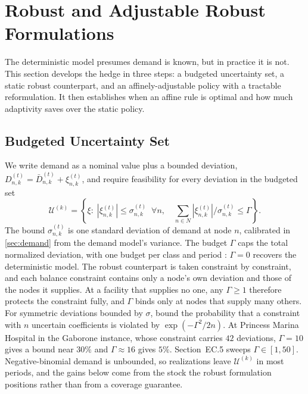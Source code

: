 \documentclass[11pt]{article}
\begin{document}
\section{Robust and Adjustable Robust Formulations}
\label{sec:robust}

The deterministic model presumes demand is known, but in practice it is not.
This section develops the hedge in three steps: a budgeted uncertainty set, a static robust counterpart, and an affinely-adjustable policy with a tractable reformulation.
It then establishes when an affine rule is optimal and how much adaptivity saves over the static policy.

\subsection{Budgeted Uncertainty Set}
\label{sec:uncertainty}

We write demand as a nominal value plus a bounded deviation, $D_{n,k}^{(t)} = \bar D_{n,k}^{(t)} + \xi_{n,k}^{(t)}$, and require feasibility for every deviation in the budgeted set
\begin{equation}
\mathcal{U}^{(k)} = \left\{ \xi : \; |\xi_{n,k}^{(t)}| \le \sigma_{n,k}^{(t)} \;\; \forall n, \quad
\textstyle\sum_{n\in N} |\xi_{n,k}^{(t)}| / \sigma_{n,k}^{(t)} \le \Gamma \right\}.
\label{eq:uncertaintyset}
\end{equation}
The bound $\sigma_{n,k}^{(t)}$ is one standard deviation of demand at node $n$, calibrated in \Sec\ref{sec:demand} from the demand model's variance.
The budget $\Gamma$ caps the total normalized deviation, with one budget per class and period \citep{bertsim04}: $\Gamma = 0$ recovers the deterministic model.
The robust counterpart is taken constraint by constraint, and each balance constraint contains only a node's own deviation and those of the nodes it supplies.
At a facility that supplies no one, any $\Gamma \ge 1$ therefore protects the constraint fully, and $\Gamma$ binds only at nodes that supply many others.
For symmetric deviations bounded by $\sigma$, \citet{bertsim04} bound the probability that a constraint with $n$ uncertain coefficients is violated by $\exp(-\Gamma^{2}/2n)$.
At Princess Marina Hospital in the Gaborone instance, whose constraint carries $42$ deviations, $\Gamma = 10$ gives a bound near $30\%$ and $\Gamma \approx 16$ gives $5\%$.
Section~EC.5 sweeps $\Gamma \in [1,50]$.
Negative-binomial demand is unbounded, so realizations leave $\mathcal{U}^{(k)}$ in most periods, and the gains below come from the stock the robust formulation positions rather than from a coverage guarantee.
\end{document}
